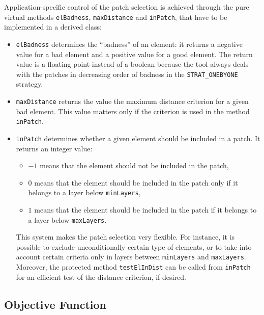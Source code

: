 \documentclass[12pt,a4paper,a4wide]{article}
\begin{document}
Application-specific control of the patch selection is achieved
through the pure virtual methods \texttt{elBadness},
\texttt{maxDistance} and \texttt{inPatch}, that have to be
implemented in a derived class:
\begin{itemize}
\item \texttt{elBadness} determines the ``badness'' of an element:
it returns a negative value for a bad element and a positive value
for a good element. The return value is a floating point instead of
a boolean because the tool always deals with the patches in
decreasing order of badness in the \texttt{STRAT\_ONEBYONE} strategy.
\item \texttt{maxDistance} returns the value the maximum distance
criterion for a given bad element. This value matters only if the
criterion is used in the method \texttt{inPatch}.
\item \texttt{inPatch} determines whether a given element should be
included in a patch. It returns an integer value:
\begin{itemize}
\item $-1$ means that the element should not be included in the patch,
\item $0$ means that the element should be included in the patch only if
it belongs to a layer below \texttt{minLayers},
\item $1$ means that the element should be included in the patch if
it belongs to a layer below \texttt{maxLayers}.
\end{itemize}
This system makes the patch selection very flexible. For instance, it is
possible to exclude unconditionally certain type of elements, or to take
into account certain criteria only in layers between \texttt{minLayers}
and \texttt{maxLayers}. Moreover, the protected method
\texttt{testElInDist} can be called from \texttt{inPatch} for an
efficient test of the distance criterion, if desired.
\end{itemize}



\subsection{Objective Function}\label{sec:obj-func}
\end{document}
